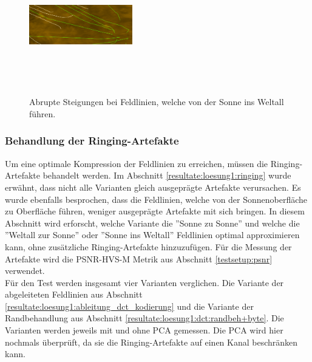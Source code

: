 \begin{figure}[!htbp]
\center
\includegraphics[width=0.4\textwidth,height=6cm,keepaspectratio]{./pictures/resultate/loesung1/ringing/haar-like.png}
	\caption{Abrupte Steigungen bei Feldlinien, welche von der Sonne ins Weltall führen.}
	\label{resultate:loesung1:dct:randbehandlung:harte_richtungswechsel}
\end{figure}

\subsubsection{Behandlung der Ringing-Artefakte} \label{resultate:loesung1:behandlung_ringing}
Um eine optimale Kompression der Feldlinien zu erreichen, müssen die Ringing-Artefakte behandelt werden. Im Abschnitt \ref{resultate:loesung1:ringing} wurde erwähnt, dass nicht alle Varianten gleich ausgeprägte Artefakte verursachen. Es wurde ebenfalls besprochen, dass die Feldlinien, welche von der Sonnenoberfläche zu Oberfläche führen, weniger ausgeprägte Artefakte mit sich bringen. In diesem Abschnitt wird erforscht, welche Variante die ''Sonne zu Sonne'' und welche die ''Weltall zur Sonne'' oder ''Sonne ins Weltall'' Feldlinien optimal approximieren kann, ohne zusätzliche Ringing-Artefakte hinzuzufügen. Für die Messung der Artefakte wird die PSNR-HVS-M Metrik aus Abschnitt \ref{testsetup:psnr} verwendet.\\
Für den Test werden insgesamt vier Varianten verglichen. Die Variante der abgeleiteten Feldlinien aus Abschnitt \ref{resultate:loesung1:ableitung_dct_kodierung} und die Variante der Randbehandlung aus Abschnitt \ref{resultate:loesung1:dct:randbeh+byte}. Die Varianten werden jeweils mit und ohne PCA gemessen. Die PCA wird hier nochmals überprüft, da sie die Ringing-Artefakte auf einen Kanal beschränken kann.

